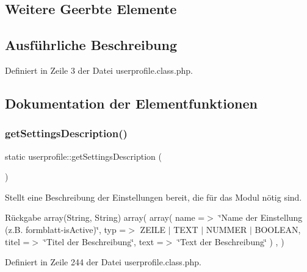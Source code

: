 \subsection*{Weitere Geerbte Elemente}


\subsection{Ausführliche Beschreibung}


Definiert in Zeile 3 der Datei userprofile.\+class.\+php.



\subsection{Dokumentation der Elementfunktionen}
\mbox{\label{classuserprofile_a7f7df46f299bdd7f223e0a38d262e06d}} 
\subsubsection{\texorpdfstring{get\+Settings\+Description()}{getSettingsDescription()}}
{\footnotesize\ttfamily static userprofile\+::get\+Settings\+Description (\begin{DoxyParamCaption}{ }\end{DoxyParamCaption})\hspace{0.3cm}{\ttfamily [static]}}

Stellt eine Beschreibung der Einstellungen bereit, die für das Modul nötig sind. \begin{DoxyReturn}{Rückgabe}
array(\+String, String) array( array( \textquotesingle{}name\textquotesingle{} =$>$ \char`\"{}\+Name der Einstellung (z.\+B. formblatt-\/is\+Active)\char`\"{}, \textquotesingle{}typ\textquotesingle{} =$>$ Z\+E\+I\+LE $\vert$ T\+E\+XT $\vert$ N\+U\+M\+M\+ER $\vert$ B\+O\+O\+L\+E\+AN, \textquotesingle{}titel\textquotesingle{} =$>$ \char`\"{}\+Titel der Beschreibung\char`\"{}, \textquotesingle{}text\textquotesingle{} =$>$ \char`\"{}\+Text der Beschreibung\char`\"{} ) , ) 
\end{DoxyReturn}


Definiert in Zeile 244 der Datei userprofile.\+class.\+php.

\mbox{\label{classuserprofile_aad8cc7ff45937e8bc4f05799fcfa8c95}} 
